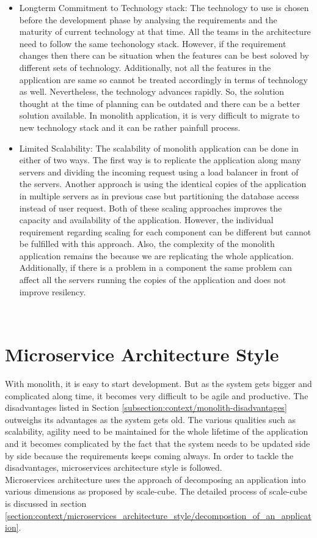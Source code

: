 \begin{itemize}[leftmargin=.5in]
\\
\item Longterm Commitment to Technology stack: The technology to use is chosen before the development phase by analysing the requirements and the maturity of current technology at that time. All the teams in the architecture need to follow the same techonology stack. However, if the requirement changes then there can be situation when the features can be best soloved by different sets of technology. Additionally, not all the features in the application are same so cannot be treated accordingly in terms of technology as well. Nevertheless, the technology advances rapidly. So, the solution thought at the time of planning can be outdated and there can be a better solution available. In monolith application, it is very difficult to migrate to new technology stack and it can be rather painfull process.
\\
\item Limited Scalability: The scalability of monolith application can be done in either of two ways. The first way is to replicate the application along many servers and dividing the incoming request using a load balancer in front of the servers. Another approach is using the identical copies of the application in multiple servers as in previous case but partitioning the database access instead of user request. Both of these scaling approaches improves the capacity and availability of the application. However, the individual requirement regarding scaling for each component can be different but cannot be fulfilled with this approach. Also, the complexity of the monolith application remains the because we are replicating the whole application. Additionally, if there is a problem in a component the same problem can affect all the servers running the copies of the application and does not improve resilency.\cite{MacVittie:2014aa}\cite{Namiot:2014aa}
\end{itemize}
\\

\section{Microservice Architecture Style}\label{section:context/microservices_architecture_style}
With monolith, it is easy to start development. But as the system gets bigger and complicated along time, it becomes very difficult to be agile and productive. The disadvantages listed in Section \ref{subsection:context/monolith-disadvantages} outweighs its advantages as the system gets old. The various qualities such as scalability, agility need to be maintained for the whole lifetime of the application and it becomes complicated by the fact that the system needs to be updated side by side because the requirements keeps coming always. In order to tackle the disadvantages, microservices architecture style is followed.\\
Microservices architecture uses the approach of decomposing an application into various dimensions as proposed by scale-cube. The detailed process of scale-cube is discussed in section \ref{section:context/microservices_architecture_style/decompostion_of_an_application}.

